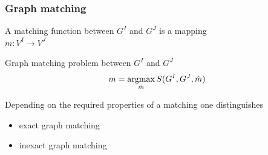 \documentclass[handout]{beamer}
\def\argmax{\mathop{\rm argmax}}						%
\begin{document}
\begin{frame}
\frametitle{Graph matching}
A matching function between $G^I$ and $G^J$ is a mapping %
\\
{\hspace{4cm}$m:V^I\rightarrow V^J$}

Graph matching problem between $G^I$ and $G^J$ 
\begin{equation*}
m = \argmax_{\hat{m}}S(G^I, G^J, \hat{m})
\end{equation*}


Depending on the required properties of a matching one distinguishes
\begin{itemize}
\item exact graph matching
\item inexact graph matching
\end{itemize}

\end{frame}
\end{document}
